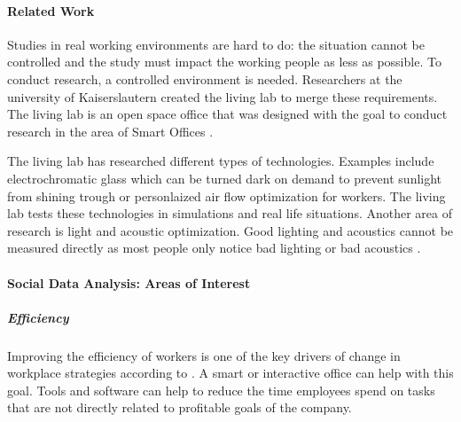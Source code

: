 
\paragraph{Related Work}
Studies in real working environments are hard to do: the situation cannot be controlled and the 
study must impact the working people as less as possible. To conduct research, a controlled 
environment is needed. Researchers at the university of Kaiserslautern created the living lab to 
merge these requirements. The living lab is an open space office that was designed with the goal to 
conduct research in the area of Smart Offices \cite{living-lab}.


The living lab has researched different types of technologies. Examples include electrochromatic 
glass which can be turned dark on demand to prevent sunlight from shining trough or personlaized air 
flow optimization for workers. The living lab tests these technologies in simulations and real life 
situations. Another area of research is light and acoustic optimization. Good lighting and acoustics 
cannot be measured directly as most people only notice bad lighting or bad acoustics \cite{living-lab}.


\paragraph{Social Data Analysis: Areas of Interest}
\subparagraph{Efficiency}\label{sec:sda-efficiency}
Improving the efficiency of workers is one of the key drivers of change in workplace strategies 
according to \cite{hub13}. A smart or interactive office can help with this goal. Tools and software 
can help to reduce the time employees spend on tasks that are not directly related to profitable 
goals of the company.

